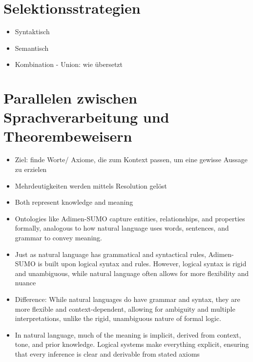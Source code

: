 \documentclass[german,version-2020-11]{uzl-thesis}
\begin{document}
\chapter{Selektionsstrategien}
  \begin{itemize}
    \item Syntaktisch 
    \item Semantisch
    \item Kombination - Union: wie übersetzt
  \end{itemize}
\chapter{Parallelen zwischen Sprachverarbeitung und Theorembeweisern}
\begin{itemize}
  \item Ziel: finde Worte/ Axiome, die zum Kontext passen, um eine gewisse Aussage zu erzielen
  \item Mehrdeutigkeiten werden mittels Resolution gelöst
  \item Both represent knowledge and meaning
  \item Ontologies like Adimen-SUMO capture entities, relationships, and properties formally, analogous to how natural language uses words, sentences, and grammar to convey meaning.
  \item Just as natural language has grammatical and syntactical rules, Adimen-SUMO is built upon logical syntax and rules. However, logical syntax is rigid and unambiguous, while natural language often allows for more flexibility and nuance
  \item Difference: While natural languages do have grammar and syntax, they are more flexible and context-dependent, allowing for ambiguity and multiple interpretations, unlike the rigid, unambiguous nature of formal logic.
  \item In natural language, much of the meaning is implicit, derived from context, tone, and prior knowledge. Logical systems make everything explicit, ensuring that every inference is clear and derivable from stated axioms
\end{itemize}
\end{document}
